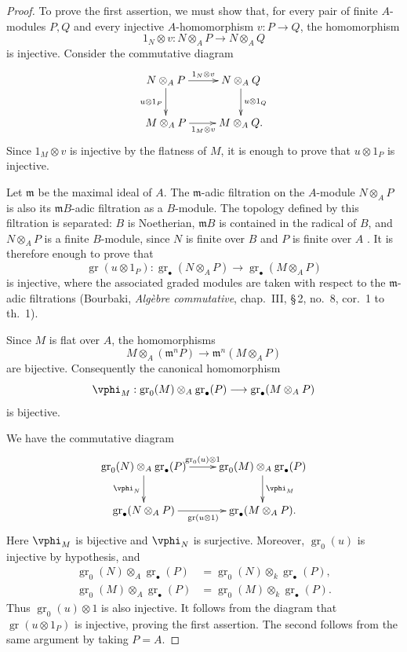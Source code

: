 \begin{proof}
To prove the first assertion, we must show that, for every pair of
finite $A$-modules $P,Q$ and every injective $A$-homomorphism
$v:P\to Q$, the homomorphism
\[
  1_N\otimes v:N\otimes_A P\longrightarrow N\otimes_A Q
\]
is injective.  Consider the commutative diagram
\[
  \xymatrix{
    N\otimes_A P
      \ar[r]^-{1_N\otimes v}
      \ar[d]_{u\otimes1_P}
      &
    N\otimes_A Q
      \ar[d]^{u\otimes1_Q}
    \\
    M\otimes_A P
      \ar[r]_{1_M\otimes v}
      &
    M\otimes_A Q .
  }
\]
Since $1_M\otimes v$ is injective by the flatness of $M$, it is
enough to prove that $u\otimes1_P$ is injective.

Let $\mathfrak m$ be the maximal ideal of $A$.  The
$\mathfrak m$-adic filtration on the $A$-module $N\otimes_A P$ is
also its $\mathfrak mB$-adic filtration as a $B$-module.  The
topology defined by this filtration is separated: $B$ is
Noetherian, $\mathfrak mB$ is contained in the radical of $B$, and
$N\otimes_A P$ is a finite $B$-module, since $N$ is finite over $B$
and $P$ is finite over $A$ .  It is therefore
enough to prove that
\[
  \operatorname{gr}(u\otimes1_P):
  \operatorname{gr}_\bullet(N\otimes_A P)
  \longrightarrow
  \operatorname{gr}_\bullet(M\otimes_A P)
\]
is injective, where the associated graded modules are taken with
respect to the $\mathfrak m$-adic filtrations (Bourbaki,
\emph{Alg\`ebre commutative}, chap.~III, \S\,2, no.~8, cor.~1 to
th.~1).

Since $M$ is flat over $A$, the homomorphisms
\[
  M\otimes_A(\mathfrak m^nP)
  \longrightarrow
  \mathfrak m^n(M\otimes_A P)
\]
are bijective.  Consequently the canonical homomorphism
\[
  \vphi_M:
  \operatorname{gr}_0(M)\otimes_A\operatorname{gr}_\bullet(P)
  \longrightarrow
  \operatorname{gr}_\bullet(M\otimes_A P)
\]
is bijective.


We have the commutative diagram
\[
  \xymatrix{
    \operatorname{gr}_0(N)\otimes_A\operatorname{gr}_\bullet(P)
      \ar[r]^-{\operatorname{gr}_0(u)\otimes1}
      \ar[d]_{\vphi_N}
      &
    \operatorname{gr}_0(M)\otimes_A\operatorname{gr}_\bullet(P)
      \ar[d]^{\vphi_M}
    \\
    \operatorname{gr}_\bullet(N\otimes_A P)
      \ar[r]_{\operatorname{gr}(u\otimes1)}
      &
    \operatorname{gr}_\bullet(M\otimes_A P).
  }
\]
Here $\vphi_M$ is bijective and $\vphi_N$ is surjective.
Moreover, $\operatorname{gr}_0(u)$ is injective by hypothesis, and
\[
\begin{split}
  \operatorname{gr}_0(N)\otimes_A\operatorname{gr}_\bullet(P)
    &=
  \operatorname{gr}_0(N)\otimes_k\operatorname{gr}_\bullet(P),\\
  \operatorname{gr}_0(M)\otimes_A\operatorname{gr}_\bullet(P)
    &=
  \operatorname{gr}_0(M)\otimes_k\operatorname{gr}_\bullet(P).
\end{split}
\]
Thus $\operatorname{gr}_0(u)\otimes1$ is also injective.  It
follows from the diagram that $\operatorname{gr}(u\otimes1_P)$ is
injective, proving the first assertion.  The second follows from
the same argument by taking $P=A$.
\end{proof}

